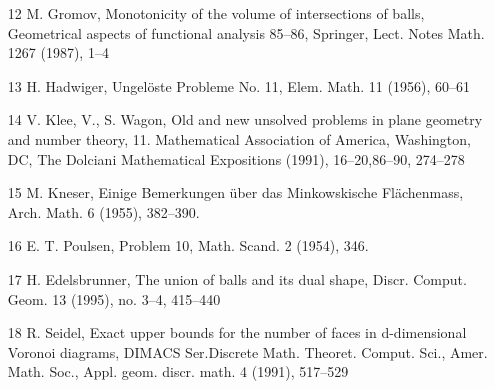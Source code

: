 \documentclass[12pt]{report}
\begin{document}
\begin{enumerate}
\item [12] M. Gromov, Monotonicity of the volume of intersections of balls, Geometrical aspects of functional analysis 85–86, Springer, Lect. Notes Math. 1267 (1987), 1–4\\
\item [13] H. Hadwiger, Ungelöste Probleme No. 11, Elem. Math. 11 (1956), 60–61\\
\item [14] V. Klee, V., S. Wagon, Old and new unsolved problems in plane geometry and number theory, 11. Mathematical Association of America, Washington, DC, The Dolciani Mathematical Expositions (1991), 16–20,86–90, 274–278\\
\item [15] M. Kneser, Einige Bemerkungen über das Minkowskische Flächenmass, Arch. Math. 6 (1955), 382–390.
\item [16] E. T. Poulsen, Problem 10, Math. Scand. 2 (1954), 346.\\
\item [17] H. Edelsbrunner, The union of balls and its dual shape, Discr. Comput. Geom. 13 (1995), no. 3–4, 415–440\\
\item [18] R. Seidel, Exact upper bounds for the number of faces in d-dimensional Voronoi diagrams, DIMACS Ser.Discrete Math. Theoret. Comput. Sci., Amer. Math. Soc., Appl. geom. discr. math. 4 (1991), 517–529\\

\end{enumerate}
\end{document}
